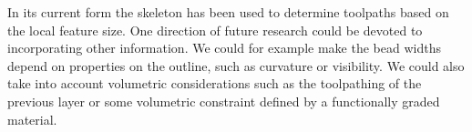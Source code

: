 In its current form the skeleton has been used to determine toolpaths based on the local feature size.
One direction of future research could be devoted to incorporating other information.
We could for example make the bead widths depend on properties on the outline, such as curvature or visibility.
We could also take into account volumetric considerations such as the toolpathing of the previous layer or some volumetric constraint defined by a functionally graded material.


